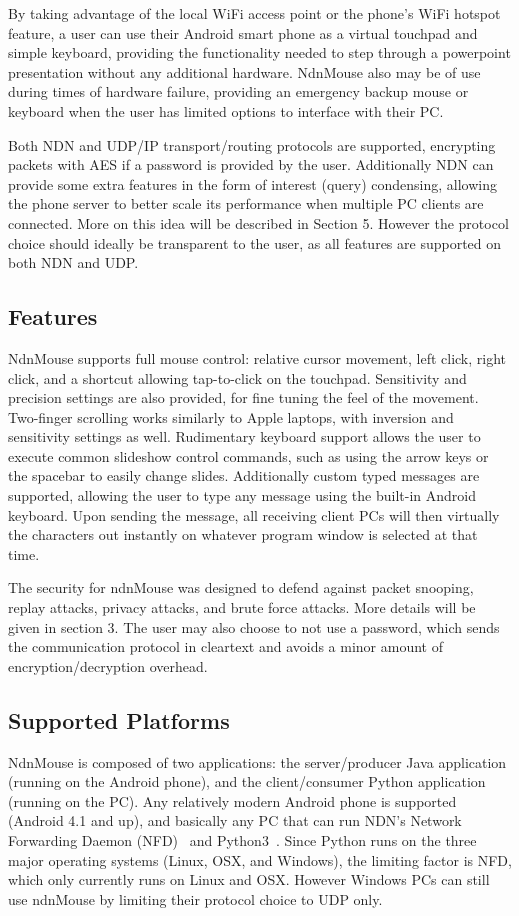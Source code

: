 \documentclass{sig-alternate}
\renewcommand\_{\textunderscore\allowbreak}  %
\begin{document}
By taking advantage of the local WiFi access point or the phone's WiFi hotspot feature, a user can use their Android smart phone as a virtual touchpad and simple keyboard, providing the functionality needed to step through a powerpoint presentation without any additional hardware. NdnMouse also may be of use during times of hardware failure, providing an emergency backup mouse or keyboard when the user has limited options to interface with their PC.

Both NDN and UDP/IP transport/routing protocols are supported, encrypting packets with AES if a password is provided by the user. Additionally NDN can provide some extra features in the form of interest (query) condensing, allowing the phone server to better scale its performance when multiple PC clients are connected. More on this idea will be described in Section 5. However the protocol choice should ideally be transparent to the user, as all features are supported on both NDN and UDP.

\subsection{Features}
NdnMouse supports full mouse control: relative cursor movement, left click, right click, and a shortcut allowing tap-to-click on the touchpad. Sensitivity and precision settings are also provided, for fine tuning the feel of the movement. Two-finger scrolling works similarly to Apple laptops, with inversion and sensitivity settings as well. Rudimentary keyboard support allows the user to execute common slideshow control commands, such as using the arrow keys or the spacebar to easily change slides. Additionally custom typed messages are supported, allowing the user to type any message using the built-in Android keyboard. Upon sending the message, all receiving client PCs will then virtually the characters out instantly on whatever program window is selected at that time.

The security for ndnMouse was designed to defend against packet snooping, replay attacks, privacy attacks, and brute force attacks. More details will be given in section 3. The user may also choose to not use a password, which sends the communication protocol in cleartext and avoids a minor amount of encryption/decryption overhead. 

\subsection{Supported Platforms}
NdnMouse is composed of two applications: the server/producer Java application (running on the Android phone), and the client/consumer Python application (running on the PC). Any relatively modern Android phone is supported (Android 4.1 and up), and basically any PC that can run NDN's Network Forwarding Daemon (NFD)~\cite{nfd} and Python3~\cite{python3}. Since Python runs on the three major operating systems (Linux, OSX, and Windows), the limiting factor is NFD, which only currently runs on Linux and OSX. However Windows PCs can still use ndnMouse by limiting their protocol choice to UDP only.
\end{document}
